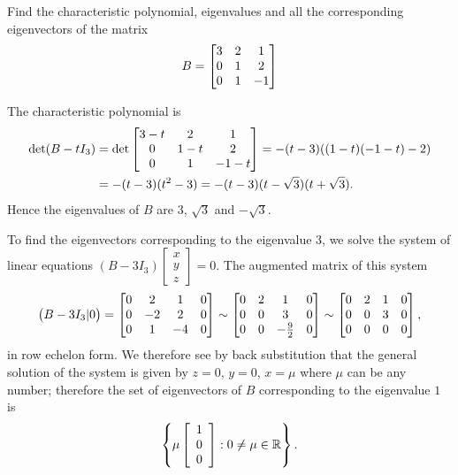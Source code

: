 \documentclass[a4paper]{amsart}
\renewenvironment{solution}{\SolutionInline}{\endSolutionInline}
\begin{document}
\begin{exercise}\label{ex-evectors-ii}
 Find the characteristic polynomial, eigenvalues and all the corresponding
 eigenvectors of the matrix
 \[ B = \left[\begin{matrix} 3 & 2 & 1 \\ 0 & 1 & 2 \\ 0 & 1 & -1 \end{matrix}\right] \]
\end{exercise}
\begin{solution}
 The characteristic polynomial is
    \begin{align*} \det (B - tI_3) & =
    \det \left[\begin{matrix}
    3-t & 2 & 1 \\
 0 & 1-t & 2 \\
 0 & 1 & -1-t
    \end{matrix}\right]=-(t-3)((1-t)(-1-t) - 2)\\ & = -(t-3)(t^2-3)
    = -(t-3)(t - \sqrt{3})(t+\sqrt{3}).
    \end{align*}
 Hence the eigenvalues of $B$ are $3$, $\sqrt{3}$ and $-\sqrt{3}$.

 To find the eigenvectors corresponding to the eigenvalue $3$, we
 solve the system of linear equations $(B - 3I_3)\left[
 \begin{array}{c}x \\ y\\z
 \end{array} \right] = 0$. The augmented matrix of this system
 $$
 \big(B - 3I_3|0\big) = \left[\begin{matrix} 0& 2&
 1&0\\0&-2&2&0\\0&1&-4&0\end{matrix}\right] \sim \left[\begin{matrix} 0& 2&
 1&0\\0&0&3&0\\0&0&-\frac{9}{2}&0\end{matrix}\right] \sim \left[\begin{matrix}
 0& 2& 1&0\\0&0&3&0\\0&0&0&0\end{matrix}\right],
 $$
 in row echelon form. We therefore see by back substitution that
 the general solution of the system is given by $z = 0$, $y = 0$,
 $x = \mu$ where $\mu$ can be any number; therefore the set of
 eigenvectors of $B$ corresponding to the eigenvalue $1$ is
 $$
 \left\{ \mu \left[ \begin{array}{c} 1\\0\\0
 \end{array} \right] : 0 \neq \mu \in {\mathbb{R}} \right\}.
 $$


\end{solution}
\end{document}
